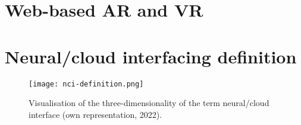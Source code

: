 



\section{Web-based AR and VR}
\label{chapter2-web-based-ar-and-vr}


\section{Neural/cloud interfacing definition}
\label{chapter2-neural-cloud-interfacing-definition}

\begin{figure}[ht]
  \centering
  \texttt{[image: nci-definition.png]}
  \caption{Visualisation of the three-dimensionality of the term neural/cloud interface (own representation, 2022).}
  \label{fig:nci-definition}
\end{figure}




